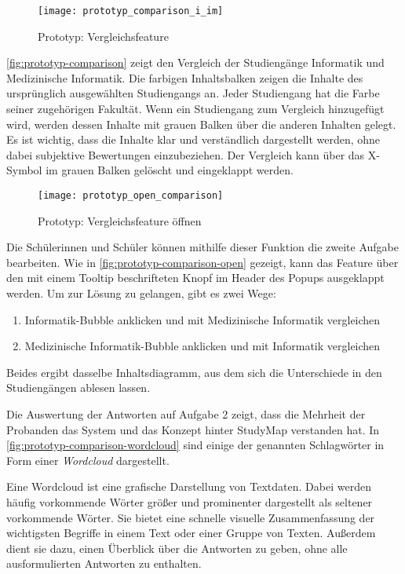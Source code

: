 \begin{figure}[H]
    \centering
    \texttt{[image: prototyp\_comparison\_i\_im]}
    \caption{Prototyp: Vergleichsfeature}
    \label{fig:prototyp-comparison}
\end{figure}

\autoref{fig:prototyp-comparison} zeigt den Vergleich der Studiengänge Informatik und Medizinische Informatik. Die farbigen Inhaltsbalken zeigen die Inhalte des ursprünglich ausgewählten Studiengangs an. Jeder Studiengang hat die Farbe seiner zugehörigen Fakultät. Wenn ein Studiengang zum Vergleich hinzugefügt wird, werden dessen Inhalte mit grauen Balken über die anderen Inhalten gelegt. Es ist wichtig, dass die Inhalte klar und verständlich dargestellt werden, ohne dabei subjektive Bewertungen einzubeziehen. Der Vergleich kann über das X-Symbol im grauen Balken gelöscht und eingeklappt werden.

\begin{figure}[H]
    \centering
    \texttt{[image: prototyp\_open\_comparison]}
    \caption{Prototyp: Vergleichsfeature öffnen}
    \label{fig:prototyp-comparison-open}
\end{figure}

Die Schülerinnen und Schüler können mithilfe dieser Funktion die zweite Aufgabe bearbeiten. Wie in \autoref{fig:prototyp-comparison-open} gezeigt, kann das Feature über den mit einem Tooltip beschrifteten Knopf im Header des Popups ausgeklappt werden. Um zur Lösung zu gelangen, gibt es zwei Wege:

\begin{enumerate}
    \item Informatik-Bubble anklicken und mit Medizinische Informatik vergleichen
    \item \glqq Medizinische Informatik\grqq{}-Bubble anklicken und mit Informatik vergleichen
\end{enumerate}

Beides ergibt dasselbe Inhaltsdiagramm, aus dem sich die Unterschiede in den Studiengängen ablesen lassen.

Die Auswertung der Antworten auf Aufgabe 2 zeigt, dass die Mehrheit der Probanden das System und das Konzept hinter StudyMap verstanden hat. In \autoref{fig:prototyp-comparison-wordcloud} sind einige der genannten Schlagwörter in Form einer \textit{Wordcloud} dargestellt.

Eine Wordcloud ist eine grafische Darstellung von Textdaten. Dabei werden häufig vorkommende Wörter größer und prominenter dargestellt als seltener vorkommende Wörter. Sie bietet eine schnelle visuelle Zusammenfassung der wichtigsten Begriffe in einem Text oder einer Gruppe von Texten. Außerdem dient sie dazu, einen Überblick über die Antworten zu geben, ohne alle ausformulierten Antworten zu enthalten.

